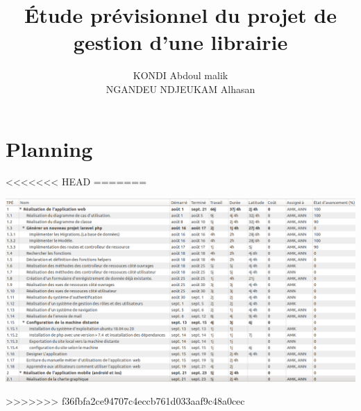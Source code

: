 \documentclass[12pt,a4paper]{article}
\author{KONDI Abdoul malik \\ NGANDEU NDJEUKAM Alhasan}
\title{Étude prévisionnel du projet de gestion d'une librairie}
\begin{document}
\maketitle
\tableofcontents
\newpage

\section{Planning}

<<<<<<< HEAD
=======
\begin{center}
\includegraphics[width=16cm]{images/taches.png}
\end{center}
>>>>>>> f36fbfa2ce94707c4eccb761d033aaf9c48a0cec

\newpage
\end{document}
